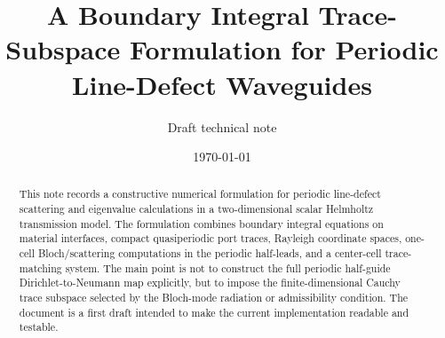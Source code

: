 \documentclass[11pt]{article}
\title{A Boundary Integral Trace-Subspace Formulation for Periodic Line-Defect Waveguides}
\author{Draft technical note}
\date{\today}
\begin{document}
\maketitle

\begin{abstract}
This note records a constructive numerical formulation for periodic line-defect
scattering and eigenvalue calculations in a two-dimensional scalar Helmholtz
transmission model.  The formulation combines boundary integral equations on
material interfaces, compact quasiperiodic port traces, Rayleigh coordinate
spaces, one-cell Bloch/scattering computations in the periodic half-leads, and a
center-cell trace-matching system.  The main point is not to construct the full
periodic half-guide Dirichlet-to-Neumann map explicitly, but to impose the
finite-dimensional Cauchy trace subspace selected by the Bloch-mode radiation or
admissibility condition.  The document is a first draft intended to make the
current implementation readable and testable.
\end{abstract}

\tableofcontents










\end{document}
